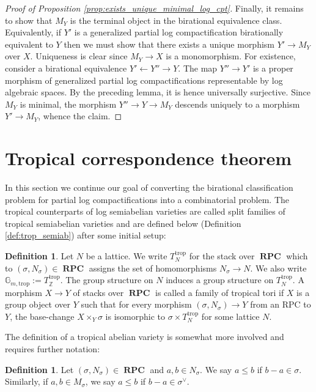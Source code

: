 \documentclass[11pt]{amsart}
\theoremstyle{definition}
\newtheorem{definition}[theorem]{Definition}
\theoremstyle{remark}
\def\trop{\mathrm{trop}}
\DeclareMathOperator{\RPC}{\mathbf{RPC}}
\begin{document}
\begin{proof}[Proof of Proposition \ref{prop:exists_unique_minimal_log_cpt}]
	Finally, it remains to show that $M_Y$ is the terminal object
	in the birational equivalence class. Equivalently, if $Y'$ is a generalized partial log compactification
	birationally equivalent to $Y$ then we must show that there exists a unique morphism $Y'\to M_Y$ over $X$.
	Uniqueness is clear since $M_Y\to X$ is a monomorphism. For existence, consider a birational equivalence
	$Y'\leftarrow Y''\rightarrow Y$. The map $Y''\to Y'$ is a proper
	morphism of generalized partial log compactifications representable by log
	algebraic spaces. By the preceding lemma, it is hence universally surjective. Since $M_Y$
	is minimal, the morphism $Y''\to Y\to M_Y$ descends uniquely to a morphism $Y'\to M_Y$, whence the claim.
\end{proof}

\section{Tropical correspondence theorem}
\label{sec:tropical_corresp}

In this section we continue our goal of converting the birational
classification problem for partial log compactifications into a combinatorial
problem. The tropical counterparts of log semiabelian varieties are
called split families of tropical semiabelian varieties and are defined below
(Definition \ref{def:trop_semiab}) after some initial setup:

\begin{definition}
	\label{def:trop_torus}
	Let $N$ be a lattice. We write $T_N^{\trop}$ for the stack
	over $\RPC$ which to $(\sigma,N_{\sigma})\in \RPC$ assigns
	the set of homomorphisms $N_{\sigma}\to N$. We also write $\mathbb{G}_{m,\trop}:=T_{\mathbb{Z}}^{\trop}$.
	The group structure on $N$ induces a group structure on $T_N^{\trop}$.
	A morphism $X\to Y$ of stacks over $\RPC$ is called a family of tropical
	tori if $X$ is a group object over $Y$ such that for every morphism $(\sigma,N_{\sigma})\to Y$ from an RPC
	to $Y$, the base-change $X\times_Y \sigma$ is isomorphic to $\sigma\times T_N^{\trop}$
	for some lattice $N$.
\end{definition}

The definition of a tropical abelian variety is somewhat more involved and requires
further notation:

\begin{definition}
	Let $(\sigma,N_{\sigma})\in \RPC$ and $a,b\in N_{\sigma}$. We say $a\le b$ if $b-a\in \sigma$. Similarly,
	if $a,b\in M_{\sigma}$, we say $a\le b$ if $b-a\in \sigma^{\vee}$.
\end{definition}
\end{document}
